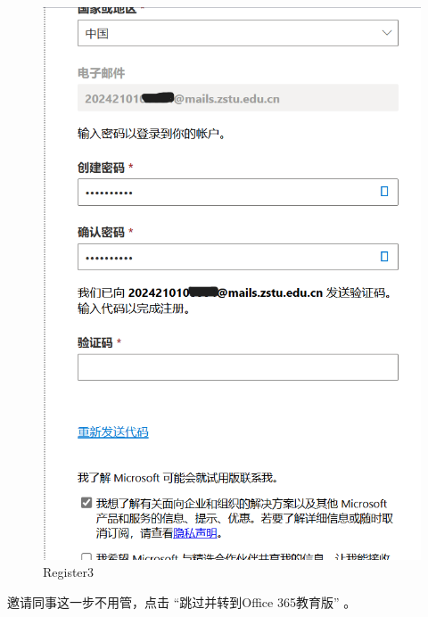 \documentclass[]{ctexbook}
\theoremstyle{definition}
\theoremstyle{definition}
\theoremstyle{definition}
\theoremstyle{definition}
\theoremstyle{remark}
\begin{document}
\begin{figure}

{\centering \includegraphics[width=0.8\linewidth]{img/OneDrive/Register_3} 

}

\caption{Register3}\label{fig:OneDrive-Register3}
\end{figure}

邀请同事这一步不用管，点击 ``跳过并转到Office 365教育版'' 。
\end{document}
